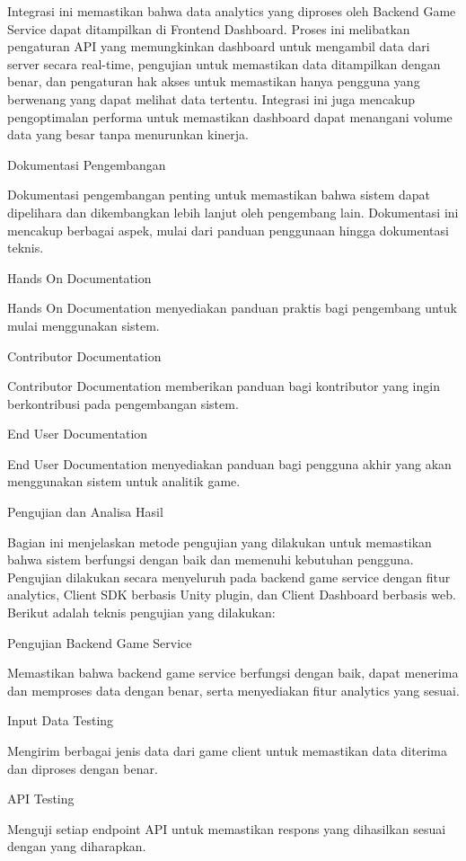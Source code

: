 Integrasi ini memastikan bahwa data analytics yang diproses oleh Backend Game Service dapat ditampilkan di Frontend Dashboard. Proses ini melibatkan pengaturan API yang memungkinkan dashboard untuk mengambil data dari server secara real-time, pengujian untuk memastikan data ditampilkan dengan benar, dan pengaturan hak akses untuk memastikan hanya pengguna yang berwenang yang dapat melihat data tertentu. Integrasi ini juga mencakup pengoptimalan performa untuk memastikan dashboard dapat menangani volume data yang besar tanpa menurunkan kinerja.

Dokumentasi Pengembangan

Dokumentasi pengembangan penting untuk memastikan bahwa sistem dapat dipelihara dan dikembangkan lebih lanjut oleh pengembang lain. Dokumentasi ini mencakup berbagai aspek, mulai dari panduan penggunaan hingga dokumentasi teknis.

Hands On Documentation

Hands On Documentation menyediakan panduan praktis bagi pengembang untuk mulai menggunakan sistem.

Contributor Documentation

Contributor Documentation memberikan panduan bagi kontributor yang ingin berkontribusi pada pengembangan sistem.

End User Documentation

End User Documentation menyediakan panduan bagi pengguna akhir yang akan menggunakan sistem untuk analitik game.

Pengujian dan Analisa Hasil

Bagian ini menjelaskan metode pengujian yang dilakukan untuk memastikan bahwa sistem berfungsi dengan baik dan memenuhi kebutuhan pengguna. Pengujian dilakukan secara menyeluruh pada backend game service dengan fitur analytics, Client SDK berbasis Unity plugin, dan Client Dashboard berbasis web. Berikut adalah teknis pengujian yang dilakukan:

Pengujian Backend Game Service

Memastikan bahwa backend game service berfungsi dengan baik, dapat menerima dan memproses data dengan benar, serta menyediakan fitur analytics yang sesuai.

Input Data Testing

Mengirim berbagai jenis data dari game client untuk memastikan data diterima dan diproses dengan benar.

API Testing

Menguji setiap endpoint API untuk memastikan respons yang dihasilkan sesuai dengan yang diharapkan.

